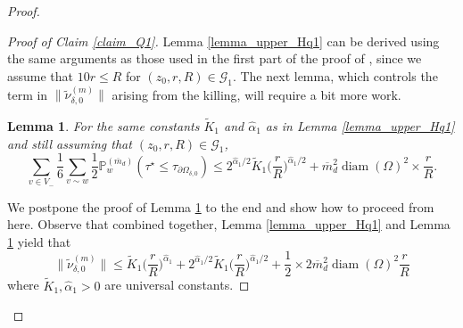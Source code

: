 \documentclass{article}
\newcommand{\PP}{{\mathbb{P}}}
\newtheorem{lemma}[theorem]{Lemma}
\theoremstyle{definition}
\theoremstyle{remark}
\theoremstyle{remark}
\begin{document}
\begin{proof}
\begin{proof}[Proof of Claim \ref{claim_Q1}]
Lemma \ref{lemma_upper_Hq1} can be derived using the same arguments as those used in the first part of the proof of \cite[Proposition~6.3]{HE}, since we assume that $10r \leq R$ for $(z_0,r,R) \in \mathcal{G}_1$. The next lemma, which controls the term in $\| \tilde \nu_{\delta, 0}^{(m)} \|$ arising from the killing, will require a bit more work.

\begin{lemma} \label{lemma_upper_killing}
For the same constants $\tilde K_1$ and $\hat \alpha_1$ as in Lemma \ref{lemma_upper_Hq1} and still assuming that $(z_0,r,R) \in \mathcal{G}_1$,
\begin{equation*}
     \sum_{v \in V_{-}} \frac{1}{6} \sum_{v \sim w} \frac{1}{2} \PP_{w}^{(\overline{m}_{d})}(\tau^{\star} \leq \tau_{\partial \Omega_{\delta, 0}}) \leq 2^{\hat \alpha_1 /2} \tilde K_1 \bigg(\frac{r}{R}\bigg)^{\hat \alpha_1 /2} + \overline{m}_d^2\operatorname{diam}(\Omega)^2\times \frac{r}{R}.
\end{equation*}
\end{lemma}

We postpone the proof of Lemma \ref{lemma_upper_killing} to the end and show how to proceed from here. Observe that combined together, Lemma \ref{lemma_upper_Hq1} and Lemma \ref{lemma_upper_killing} yield that
\begin{equation} \label{bound_nu0}
     \| \tilde \nu_{\delta, 0}^{(m)} \| \leq \tilde K_{1} \bigg(\frac{r}{R}\bigg)^{\hat \alpha_1} + 2^{\hat \alpha_1 /2} \tilde K_1 \bigg(\frac{r}{R}\bigg)^{\hat \alpha_1 /2} + \frac{1}{2} \times 2\overline{m}_d^2\operatorname{diam}(\Omega)^2 \frac{r}{R}
\end{equation}
where $\tilde K_1 , \hat \alpha_1 > 0$ are universal constants.


\end{proof}
\end{proof}
\end{document}
